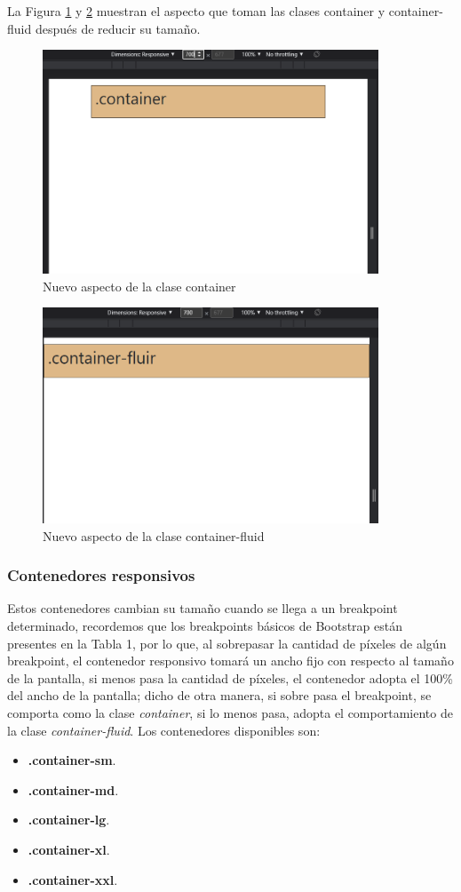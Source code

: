 La Figura \ref{fig:12} y \ref{fig:13} muestran el aspecto que toman las clases container y container-fluid después de reducir su tamaño.
\begin{figure}[H]
    \centering
    \caption{Nuevo aspecto de la clase container}
    \label{fig:12}
    \includegraphics[width=10cm]{ss/container2.png}
\end{figure}
\begin{figure}[H]
    \centering
    \caption{Nuevo aspecto de la clase container-fluid}
    \label{fig:13}
    \includegraphics[width=10cm]{ss/container-fluid2.png}
\end{figure}


\subsubsection{Contenedores responsivos}

Estos contenedores cambian su tamaño cuando se llega a un breakpoint determinado, recordemos que los breakpoints básicos de Bootstrap están presentes en la Tabla 1, por lo que, al sobrepasar la cantidad de píxeles de algún breakpoint, el contenedor responsivo tomará un ancho fijo con respecto al tamaño de la pantalla, si menos pasa la cantidad de píxeles, el contenedor adopta el 100\% del ancho de la pantalla; dicho de otra manera, si sobre pasa el breakpoint, se comporta como la clase \textit{container}, si lo menos pasa, adopta el comportamiento de la clase \textit{container-fluid}. Los contenedores disponibles son:
\begin{itemize}
    \item \textbf{.container-sm}.
    \item \textbf{.container-md}.
    \item \textbf{.container-lg}.
    \item \textbf{.container-xl}.
    \item \textbf{.container-xxl}.
\end{itemize}

